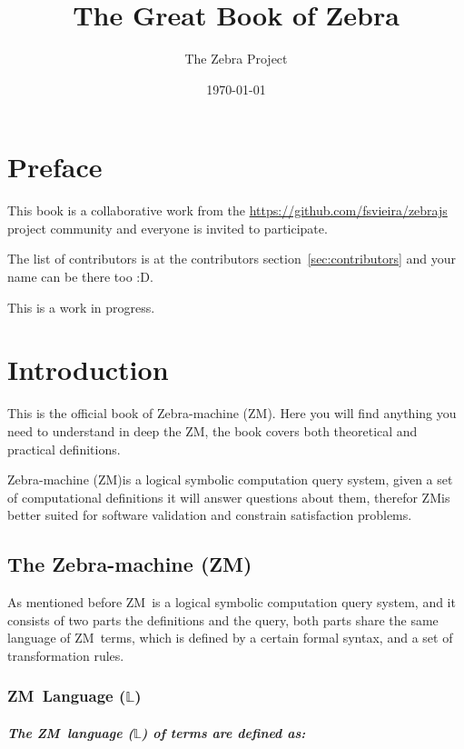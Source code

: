 \documentclass[11pt,a4paper]{report}
\newcommand{\zm}{ZM}
\newcommand{\zsystem}{Zebra-machine (\zm)}
\begin{document}
\title{The Great Book of Zebra}
\author{The Zebra Project}
\date{\today}
\maketitle

\chapter*{Preface}

This book is a collaborative work from the \href{zebrajs}{https://github.com/fsvieira/zebrajs} project community 
and everyone is invited to participate.

The list of contributors is at the contributors section~\ref{sec:contributors} and your name can be there too :D.

This is a work in progress.

\tableofcontents

\chapter{Introduction}

This is the official book of \zsystem. Here you will find anything you need to understand in deep the \zm , 
the book covers both theoretical and practical definitions.

\zsystem is a logical symbolic computation query system, given a set of computational definitions it will 
answer questions about them, therefor \zm is better suited for software validation and constrain satisfaction problems.

\section{The \zsystem}

As mentioned before \zm\ is a logical symbolic computation query system, and it consists of two parts 
the definitions and the query, both parts share the same language of \zm\ terms, which is defined by 
a certain formal syntax, and a set of transformation rules.

\subsection{\zm\ Language ($\mathbb{L}$)}
\paragraph{The \zm\ language ($\mathbb{L}$) of terms are defined as:}
\end{document}
